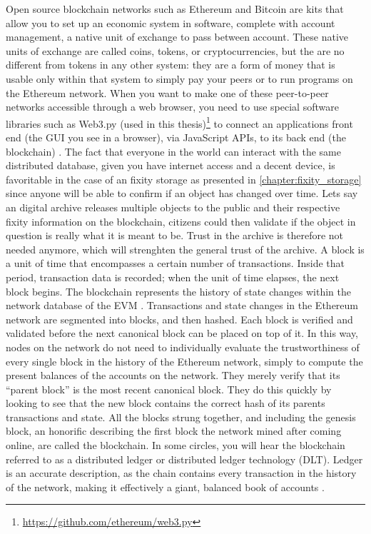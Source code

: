 Open source blockchain networks such as Ethereum and Bitcoin are kits that allow you to set up an economic system in software, complete with account management, a native unit of exchange to pass between account. These native units of exchange are called coins, tokens, or cryptocurrencies, but the are no different from tokens in any other system: they are a form of money  that is usable only within that system to simply pay your peers or to run programs on the Ethereum network. When you want to make one of these peer-to-peer networks accessible through a web browser, you need to use special software libraries such as Web3.py (used in this thesis)\footnote{\url{https://github.com/ethereum/web3.py}} to connect an applications front end (the GUI you see in a browser), via JavaScript APIs, to its back end (the blockchain) \cite[2]{dannen2017introducing}.
The fact that everyone in the world can interact with the same distributed database, given you have internet access and a decent device, is favoritable in the case of an fixity storage as presented in \ref{chapter:fixity_storage} since anyone will be able to confirm if an object has changed over time. Lets say an digital archive releases multiple objects to the public and their respective fixity information on the blockchain, citizens could then validate if the object in question is really what it is meant to be. Trust in the archive is therefore not needed anymore, which will strenghten the general trust of the archive.
A block is a unit of time that encompasses a certain number of transactions. Inside that period, transaction data is recorded; when the unit of time elapses, the next block begins. The blockchain represents the history of state changes within the network database of the EVM \cite[43]{dannen2017introducing}.
Transactions and state changes in the Ethereum network are segmented into blocks, and then hashed. Each block is verified and validated before the next canonical block can be placed on top of it. In this way, nodes on the network do not need to individually evaluate the trustworthiness of every single block in the history of the Ethereum network, simply to compute the present balances of the accounts on the network. They merely verify that its “parent block” is the most recent canonical block. They do this quickly by looking to see that the new block contains the correct hash of its parents transactions and state. All the blocks strung together, and including the genesis block, an honorific describing the first block the network mined after coming online, are called the blockchain. In some circles, you will hear the blockchain referred to as a distributed ledger or distributed ledger technology (DLT). Ledger is an accurate description, as the chain contains every transaction in the history of the network, making it effectively a giant, balanced book of accounts \cite[55]{dannen2017introducing}. 
